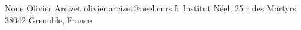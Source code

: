 \begin{conf-abstract}[]
{None}
{\color{blue} Olivier Arcizet}
{olivier.arcizet@neel.cnrs.fr}
{Institut Néel, 25 r des Martyrs 38042 Grenoble, France}
{\decofourleft \decofourright}





\printbibliography[heading=none]

\end{conf-abstract}
